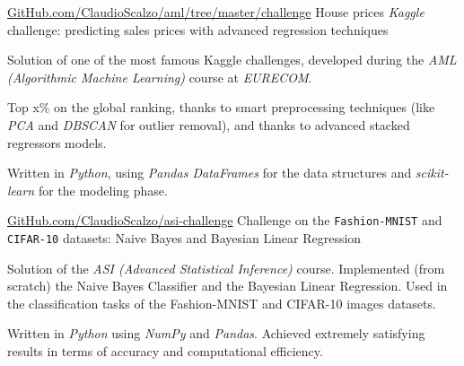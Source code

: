 \begin{cventries}
	\cvproj
		{\href{https://github.com/claudioscalzo/aml/tree/master/challenge}{GitHub.com/ClaudioScalzo/aml/tree/master/challenge}}
		{House prices \textit{Kaggle} challenge: predicting sales prices with advanced regression techniques}
		{}
		{}
		{
			\begin{cvitems} %
				\item {Solution of one of the most famous Kaggle challenges, developed during the \textit{AML (Algorithmic Machine Learning)} course at \textit{EURECOM}.}
				\item {Top x\% on the global ranking, thanks to smart preprocessing techniques (like \textit{PCA} and \textit{DBSCAN} for outlier removal), and thanks to advanced stacked regressors models.}
				\item {Written in \textit{Python}, using \textit{Pandas DataFrames} for the data structures and \textit{scikit-learn} for the modeling phase.}
			\end{cvitems}
		}
	
	\cvproj
		{\href{https://github.com/claudioscalzo/asi-challenge}{GitHub.com/ClaudioScalzo/asi-challenge}}
		{Challenge on the \texttt{Fashion-MNIST} and \texttt{CIFAR-10} datasets: Naive Bayes and Bayesian Linear Regression}
		{}
		{}
		{
			\begin{cvitems} %
				\item {Solution of the \textit{ASI (Advanced Statistical Inference)} course. Implemented (from scratch) the Naive Bayes Classifier and the Bayesian Linear Regression. Used in the classification tasks of the Fashion-MNIST and CIFAR-10 images datasets.}
				\item {Written in \textit{Python} using \textit{NumPy} and \textit{Pandas}. Achieved extremely satisfying results in terms of accuracy and computational efficiency.}
			\end{cvitems}
		}
\end{cventries}
